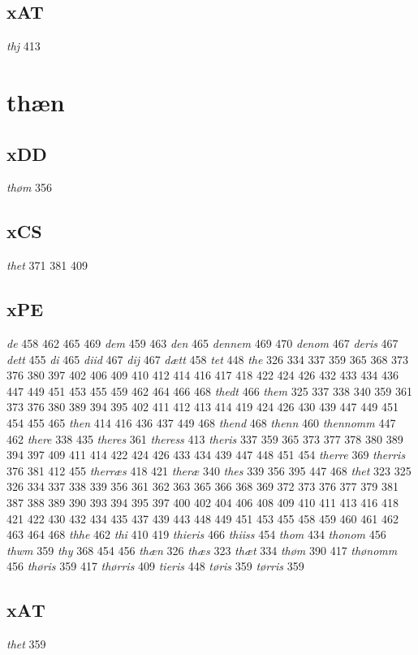 \documentclass[a4paper,twocolumn]{article}
\begin{document}
\subsection{xAT}
\label{sec:org5af5155}
\emph{thj} 413 
\section{thæn}
\label{sec:orgad7a9b0}
\subsection{xDD}
\label{sec:orga074c19}
\emph{thøm} 356 
\subsection{xCS}
\label{sec:orgaa7d5c2}
\emph{thet} 371 381 409 
\subsection{xPE}
\label{sec:org3297837}
\emph{de} 458 462 465 469 \emph{dem} 459 463 \emph{den} 465 \emph{dennem} 469 470 \emph{denom} 467 \emph{deris} 467 \emph{dett} 455 \emph{di} 465 \emph{diid} 467 \emph{dij} 467 \emph{dætt} 458 \emph{tet} 448 \emph{the} 326 334 337 359 365 368 373 376 380 397 402 406 409 410 412 414 416 417 418 422 424 426 432 433 434 436 447 449 451 453 455 459 462 464 466 468 \emph{thedt} 466 \emph{them} 325 337 338 340 359 361 373 376 380 389 394 395 402 411 412 413 414 419 424 426 430 439 447 449 451 454 455 465 \emph{then} 414 416 436 437 449 468 \emph{thend} 468 \emph{thenn} 460 \emph{thennomm} 447 462 \emph{there} 338 435 \emph{theres} 361 \emph{theress} 413 \emph{theris} 337 359 365 373 377 378 380 389 394 397 409 411 414 422 424 426 433 434 439 447 448 451 454 \emph{therre} 369 \emph{therris} 376 381 412 455 \emph{therræs} 418 421 \emph{theræ} 340 \emph{thes} 339 356 395 447 468 \emph{thet} 323 325 326 334 337 338 339 356 361 362 363 365 366 368 369 372 373 376 377 379 381 387 388 389 390 393 394 395 397 400 402 404 406 408 409 410 411 413 416 418 421 422 430 432 434 435 437 439 443 448 449 451 453 455 458 459 460 461 462 463 464 468 \emph{thhe} 462 \emph{thi} 410 419 \emph{thieris} 466 \emph{thiiss} 454 \emph{thom} 434 \emph{thonom} 456 \emph{thwm} 359 \emph{thy} 368 454 456 \emph{thæn} 326 \emph{thæs} 323 \emph{thæt} 334 \emph{thøm} 390 417 \emph{thønomm} 456 \emph{thøris} 359 417 \emph{thørris} 409 \emph{tieris} 448 \emph{tøris} 359 \emph{tørris} 359 
\subsection{xΑΤ}
\label{sec:orge008853}
\emph{thet} 359 
\end{document}
